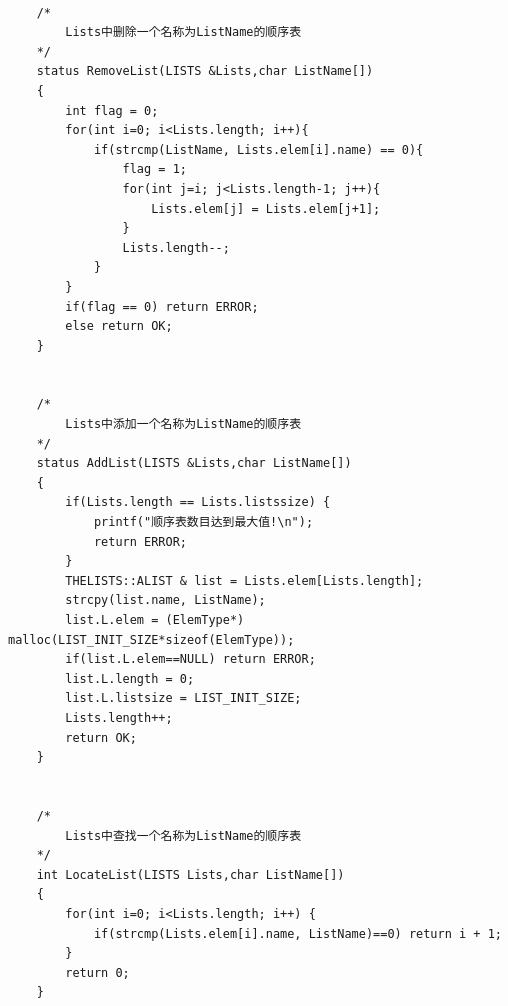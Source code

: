 \documentclass[supercite]{Experimental_Report}
\theoremstyle{definition}
\begin{document}
\begin{lstlisting}
	
	/*
		Lists中删除一个名称为ListName的顺序表
	*/
	status RemoveList(LISTS &Lists,char ListName[])
	{
		int flag = 0;
		for(int i=0; i<Lists.length; i++){
			if(strcmp(ListName, Lists.elem[i].name) == 0){
				flag = 1;
				for(int j=i; j<Lists.length-1; j++){
					Lists.elem[j] = Lists.elem[j+1];
				}
				Lists.length--;
			}
		}
		if(flag == 0) return ERROR;
		else return OK;
	}
	
	
	/*
		Lists中添加一个名称为ListName的顺序表
	*/
	status AddList(LISTS &Lists,char ListName[])
	{
		if(Lists.length == Lists.listssize) {
			printf("顺序表数目达到最大值!\n");
			return ERROR;
		}
		THELISTS::ALIST & list = Lists.elem[Lists.length];
		strcpy(list.name, ListName);
		list.L.elem = (ElemType*) malloc(LIST_INIT_SIZE*sizeof(ElemType));
		if(list.L.elem==NULL) return ERROR;
		list.L.length = 0;
		list.L.listsize = LIST_INIT_SIZE;
		Lists.length++;
		return OK;
	}
	
	
	/*
		Lists中查找一个名称为ListName的顺序表
	*/
	int LocateList(LISTS Lists,char ListName[])
	{
		for(int i=0; i<Lists.length; i++) {
			if(strcmp(Lists.elem[i].name, ListName)==0) return i + 1;
		}
		return 0;
	}
	

\end{lstlisting}
\end{document}

